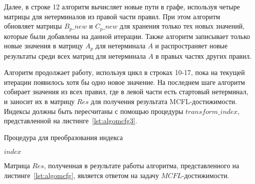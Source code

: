 Далее, в строке 12 алгоритм вычисляет новые пути в графе, используя четыре матрицы для нетерминалов из правой части правил. При этом алгоритм обновляет матрицы $B_p\_new$ и $C_p\_new$ для хранения только тех новых значений, которые были добавлены на данной итерации. Также алгоритм записывает только новые значения в матрицу $A_p$ для нетерминала $A$ и распространяет новые результаты среди всех матриц для нетерминала $A$ в правых частях других правил. 

Алгоритм продолжает работу, используя цикл в строках 10-17, пока на текущей итерации появилось хотя бы одно новое значение. На последнем шаге алгоритм собирает значения из всех правил, где в левой части есть стартовый нетерминал, и заносит их в матрицу $Res$ для получения результата MCFL-достижимости. Индексы должны быть пересчитаны с помощью процедуры $transform\_index$, представленной на листинге~\ref{lst:algomcfg3}.

\begin{algorithm}[H]
	\footnotesize
	\begin{algorithmic}[1]
		\caption{Процедура для преобразования индекса}
		\label{lst:algomcfg3}
		
		 
		\Else
		 
		\EndIf
		
		 
		\Else
		 
		\EndIf
		\EndFor
		\Return $index$
		\EndProcedure
		
	\end{algorithmic}
\end{algorithm}

Матрица $Res$, полученная в результате работы алгоритма, представленного на листинге~\ref{lst:algomcfg}, является ответом на задачу $MCFL$-достижимости.




